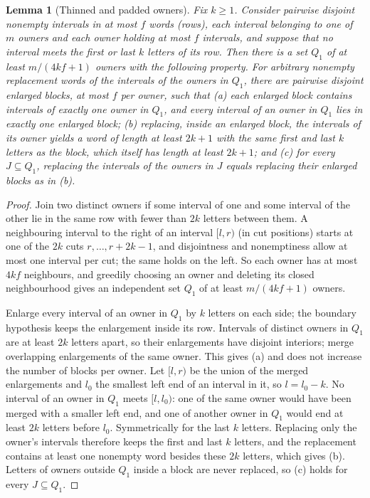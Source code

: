 \documentclass[11pt]{article}
\numberwithin{equation}{section}
\theoremstyle{plain}
\newtheorem{lemma}[theorem]{Lemma}
\theoremstyle{definition}
\theoremstyle{remark}
\theoremstyle{plain}
\begin{document}
\begin{lemma}[Thinned and padded owners]
\label{lem:lg-buffered-owners}
Fix $k\ge1$.  Consider pairwise disjoint nonempty intervals in at most $f$
words (\emph{rows}), each interval belonging to one of $m$ owners and each
owner holding at most $f$ intervals, and suppose that no interval meets the
first or last $k$ letters of its row.  Then there is a set $Q_1$ of at least
$m/(4kf+1)$ owners with the following property.  For arbitrary nonempty
replacement words of the intervals of the owners in $Q_1$, there are pairwise
disjoint \emph{enlarged blocks}, at most $f$ per owner, such that
\textup{(a)} each enlarged block contains intervals of exactly one owner in
$Q_1$, and every interval of an owner in $Q_1$ lies in exactly one enlarged
block; \textup{(b)} replacing, inside an enlarged block, the intervals of its
owner yields a word of length at least $2k+1$ with the same first and last
$k$ letters as the block, which itself has length at least $2k+1$; and
\textup{(c)} for every $J\subseteq Q_1$, replacing the intervals of the owners
in $J$ equals replacing their enlarged blocks as in \textup{(b)}.
\end{lemma}

\begin{proof}
Join two distinct owners if some interval of one and some interval of the
other lie in the same row with fewer than $2k$ letters between them.  A
neighbouring interval to the right of an interval $[l,r)$ (in cut positions)
starts at one of the $2k$ cuts $r,\ldots,r+2k-1$, and disjointness and
nonemptiness allow at most one interval per cut; the same holds on the left.
So each owner has at most $4kf$ neighbours, and greedily choosing an owner and
deleting its closed neighbourhood gives an independent set $Q_1$ of at least
$m/(4kf+1)$ owners.

Enlarge every interval of an owner in $Q_1$ by $k$ letters on each side; the
boundary hypothesis keeps the enlargement inside its row.  Intervals of
distinct owners in $Q_1$ are at least $2k$ letters apart, so their enlargements
have disjoint interiors; merge overlapping enlargements of the same owner.
This gives (a) and does not increase the number of blocks per owner.  Let
$[l,r)$ be the union of the merged enlargements and $l_0$ the smallest left end
of an interval in it, so $l=l_0-k$.  No interval of an owner in $Q_1$ meets
$[l,l_0)$: one of the same owner would have been merged with a smaller left
end, and one of another owner in $Q_1$ would end at least $2k$ letters before
$l_0$.  Symmetrically for the last $k$ letters.  Replacing only the owner's
intervals therefore keeps the first and last $k$ letters, and the replacement
contains at least one nonempty word besides these $2k$ letters, which gives
(b).  Letters of owners outside $Q_1$ inside a block are never replaced, so
(c) holds for every $J\subseteq Q_1$.
\end{proof}
\end{document}
